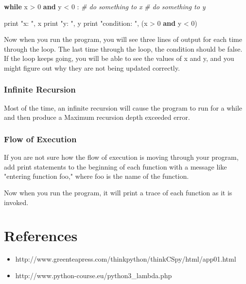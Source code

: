 \documentclass[11pt]{article}
\providecommand{\tightlist}{%
      \setlength{\itemsep}{0pt}\setlength{\parskip}{0pt}}
\newenvironment{Shaded}{}{}
\newcommand{\KeywordTok}[1]{\textcolor[rgb]{0.00,0.44,0.13}{\textbf{{#1}}}}
\newcommand{\DecValTok}[1]{\textcolor[rgb]{0.25,0.63,0.44}{{#1}}}
\newcommand{\StringTok}[1]{\textcolor[rgb]{0.25,0.44,0.63}{{#1}}}
\newcommand{\CommentTok}[1]{\textcolor[rgb]{0.38,0.63,0.69}{\textit{{#1}}}}
\newcommand{\NormalTok}[1]{{#1}}
\newcommand{\ControlFlowTok}[1]{\textcolor[rgb]{0.00,0.44,0.13}{\textbf{{#1}}}}
\newcommand{\OperatorTok}[1]{\textcolor[rgb]{0.40,0.40,0.40}{{#1}}}
\newcommand{\BuiltInTok}[1]{{#1}}
\begin{document}
\begin{Shaded}
\begin{Highlighting}[]
\ControlFlowTok{while}\NormalTok{ x }\OperatorTok{>} \DecValTok{0} \KeywordTok{and}\NormalTok{ y }\OperatorTok{<} \DecValTok{0}\NormalTok{ : }
  \CommentTok{# do something to x }
  \CommentTok{# do something to y }

  \BuiltInTok{print}  \StringTok{"x: "}\NormalTok{, x }
  \BuiltInTok{print}  \StringTok{"y: "}\NormalTok{, y }
  \BuiltInTok{print}  \StringTok{"condition: "}\NormalTok{, (x }\OperatorTok{>} \DecValTok{0} \KeywordTok{and}\NormalTok{ y }\OperatorTok{<} \DecValTok{0}\NormalTok{) }
\end{Highlighting}
\end{Shaded}

Now when you run the program, you will see three lines of output for
each time through the loop. The last time through the loop, the
condition should be false. If the loop keeps going, you will be able to
see the values of x and y, and you might figure out why they are not
being updated correctly.

\subsubsection{Infinite Recursion}\label{infinite-recursion}

Most of the time, an infinite recursion will cause the program to run
for a while and then produce a Maximum recursion depth exceeded error.

\subsubsection{Flow of Execution}\label{flow-of-execution}

If you are not sure how the flow of execution is moving through your
program, add print statements to the beginning of each function with a
message like "entering function foo," where foo is the name of the
function.

Now when you run the program, it will print a trace of each function as
it is invoked.

    \section{References}\label{references}

\begin{itemize}
\tightlist
\item
  http://www.greenteapress.com/thinkpython/thinkCSpy/html/app01.html
\item
  http://www.python-course.eu/python3\_lambda.php
\end{itemize}


    
    
    
    
\end{document}
